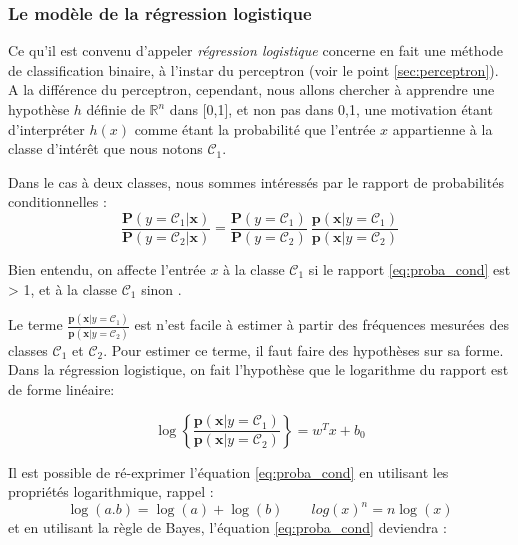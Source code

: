 	
		
		\subsubsection{Le modèle de la régression logistique} \label{subsec:reg_logistique}
		
		Ce qu'il est convenu d'appeler \textit{régression logistique} concerne en fait une méthode de classification binaire, à l'instar du perceptron (voir le point \ref{sec:perceptron}). A la différence du perceptron, cependant, nous allons chercher à apprendre une hypothèse $h$ définie de $\mathbb{R}^n$ dans [0,1], et non pas dans {0,1},  une motivation étant d'interpréter $h(x)$ comme étant la probabilité que l'entrée $x$ appartienne à la classe d'intérêt que nous notons $\mathcal{C}_1$. \cite{antoine2018apprentissage}
			
		Dans le cas à deux classes, nous sommes intéressés par le rapport de probabilités conditionnelles :
		\begin{equation}\label{eq:proba_cond}
			\frac{\mathbf{P}(y=\mathcal{C}_1|\mathbf{x})}{\mathbf{P}(y=\mathcal{C}_2|\mathbf{x})} = \frac{\mathbf{P}(y=\mathcal{C}_1)}{\mathbf{P}(y=\mathcal{C}_2)} \ \frac{\mathbf{p}(\mathbf{x}|y=\mathcal{C}_1)}{\mathbf{p}(\mathbf{x}|y=\mathcal{C}_2)}
		\end{equation}
		
		Bien entendu, on affecte l'entrée $x$ à la classe $\mathcal{C}_1$ si le rapport \ref{eq:proba_cond} est > 1, et à la classe $\mathcal{C}_1$ sinon \cite{antoine2018apprentissage}.
		
		
		Le terme $\frac{\mathbf{p}(\mathbf{x}|y=\mathcal{C}_1)}{\mathbf{p}(\mathbf{x}|y=\mathcal{C}_2)}$ est n'est facile à estimer à partir des fréquences mesurées des classes $\mathcal{C}_1$ et $\mathcal{C}_2$. Pour estimer ce terme, il faut faire des hypothèses sur sa forme.
		Dans la régression logistique, on fait l'hypothèse que le logarithme du rapport est de forme linéaire: 
		
		$$ 
		\log \left\lbrace \frac{\mathbf{p}(\mathbf{x}|y=\mathcal{C}_1)}{\mathbf{p}(\mathbf{x}|y=\mathcal{C}_2)} \right \rbrace  = w^Tx+b_0
		$$
		
		Il est possible de ré-exprimer l'équation \ref{eq:proba_cond} en utilisant les propriétés logarithmique, rappel :
		$$
		\log(a.b) = \log(a)+\log(b) \qquad log(x)^n = n\log(x) 
		$$
		et en utilisant la règle de Bayes, l'équation \ref{eq:proba_cond} deviendra :
		
